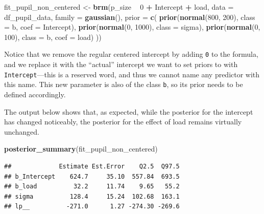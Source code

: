 \documentclass[12pt,]{krantz}
\newenvironment{Shaded}{\begin{snugshade}}{\end{snugshade}}
\newcommand{\DataTypeTok}[1]{\textcolor[rgb]{0.13,0.29,0.53}{#1}}
\newcommand{\DecValTok}[1]{\textcolor[rgb]{0.00,0.00,0.81}{#1}}
\newcommand{\KeywordTok}[1]{\textcolor[rgb]{0.13,0.29,0.53}{\textbf{#1}}}
\newcommand{\NormalTok}[1]{#1}
\newcommand{\OperatorTok}[1]{\textcolor[rgb]{0.81,0.36,0.00}{\textbf{#1}}}
\newcommand{\StringTok}[1]{\textcolor[rgb]{0.31,0.60,0.02}{#1}}
\theoremstyle{definition}
\theoremstyle{definition}
\theoremstyle{definition}
\theoremstyle{remark}
\begin{document}
\begin{Shaded}
\begin{Highlighting}[]
\NormalTok{fit_pupil_non_centered <-}\StringTok{ }\KeywordTok{brm}\NormalTok{(p_size }\OperatorTok{~}\StringTok{ }\DecValTok{0} \OperatorTok{+}\StringTok{ }\NormalTok{Intercept }\OperatorTok{+}\StringTok{ }\NormalTok{load,}
                 \DataTypeTok{data =}\NormalTok{ df_pupil_data,}
                 \DataTypeTok{family =} \KeywordTok{gaussian}\NormalTok{(),}
                 \DataTypeTok{prior =} \KeywordTok{c}\NormalTok{(}
                     \KeywordTok{prior}\NormalTok{(}\KeywordTok{normal}\NormalTok{(}\DecValTok{800}\NormalTok{, }\DecValTok{200}\NormalTok{), }\DataTypeTok{class =}\NormalTok{ b, }\DataTypeTok{coef =}\NormalTok{ Intercept),}
                     \KeywordTok{prior}\NormalTok{(}\KeywordTok{normal}\NormalTok{(}\DecValTok{0}\NormalTok{, }\DecValTok{1000}\NormalTok{), }\DataTypeTok{class =}\NormalTok{ sigma),}
                     \KeywordTok{prior}\NormalTok{(}\KeywordTok{normal}\NormalTok{(}\DecValTok{0}\NormalTok{, }\DecValTok{100}\NormalTok{), }\DataTypeTok{class =}\NormalTok{ b, }\DataTypeTok{coef =}\NormalTok{ load)}
\NormalTok{                 ))}
\end{Highlighting}
\end{Shaded}

Notice that we remove the regular centered intercept by adding \texttt{0} to the formula, and we replace it with the ``actual'' intercept we want to set priors to with \texttt{Intercept}---this is a reserved word, and thus we cannot name any predictor with this name. This new parameter is also of the class \texttt{b}, so its prior needs to be defined accordingly.

The output below shows that, as expected, while the posterior for the intercept has changed noticeably, the posterior for the effect of load remains virtually unchanged.

\begin{Shaded}
\begin{Highlighting}[]
\KeywordTok{posterior_summary}\NormalTok{(fit_pupil_non_centered)}
\end{Highlighting}
\end{Shaded}

\begin{verbatim}
##             Estimate Est.Error    Q2.5  Q97.5
## b_Intercept    624.7     35.10  557.84  693.5
## b_load          32.2     11.74    9.65   55.2
## sigma          128.4     15.24  102.68  163.1
## lp__          -271.0      1.27 -274.30 -269.6
\end{verbatim}
\end{document}
